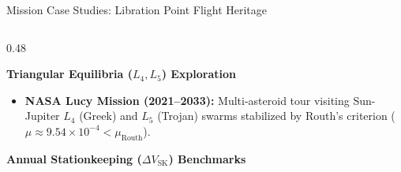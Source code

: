 \documentclass[aspectratio=169, 10pt]{beamer}
\begin{document}
\begin{frame}{Mission Case Studies: Libration Point Flight Heritage}
\begin{columns}[t]
        \begin{column}{0.48\textwidth}
            \begin{block}{\textbf{Triangular Equilibria ($L_4, L_5$) Exploration}}
                \scriptsize
                \begin{itemize}\setlength{\itemsep}{2pt}
                    \item \textbf{NASA Lucy Mission (2021--2033):} Multi-asteroid tour visiting Sun-Jupiter $L_4$ (Greek) and $L_5$ (Trojan) swarms stabilized by Routh's criterion ($\mu \approx 9.54 \times 10^{-4} < \mu_{\text{Routh}}$).
                \end{itemize}
            \end{block}
            \vspace{-0.1cm}
            \begin{exampleblock}{\textbf{Annual Stationkeeping ($\Delta V_{\text{SK}}$) Benchmarks}}
                \scriptsize
                \centering
            \end{exampleblock}
        \end{column}
    \end{columns}
\end{frame}
\end{document}

